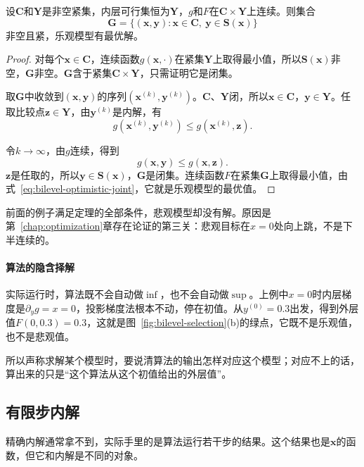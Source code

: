 \begin{theorem}[乐观模型解的存在]
\label{thm:bilevel-optimistic-existence}
设$\bm{C}$和$\bm{Y}$是非空紧集，内层可行集恒为$\bm{Y}$，$g$和$F$在$\bm{C}\times\bm{Y}$上连续。则集合
\begin{equation}
 \bm{G}=\{(\bm{x},\bm{y}):\bm{x}\in\bm{C},\ \bm{y}\in\bm{S}(\bm{x})\}
 \label{eq:bilevel-graph}
\end{equation}
非空且紧，乐观模型有最优解。
\end{theorem}

\begin{proof}
对每个$\bm{x}\in\bm{C}$，连续函数$g(\bm{x},\cdot)$在紧集$\bm{Y}$上取得最小值，所以$\bm{S}(\bm{x})$非空，$\bm{G}$非空。$\bm{G}$含于紧集$\bm{C}\times\bm{Y}$，只需证明它是闭集。

取$\bm{G}$中收敛到$(\bm{x},\bm{y})$的序列$(\bm{x}^{(k)},\bm{y}^{(k)})$。$\bm{C}$、$\bm{Y}$闭，所以$\bm{x}\in\bm{C}$，$\bm{y}\in\bm{Y}$。任取比较点$\bm{z}\in\bm{Y}$，由$\bm{y}^{(k)}$是内解，有
\[
 g(\bm{x}^{(k)},\bm{y}^{(k)})\leq g(\bm{x}^{(k)},\bm{z}).
\]

令$k\to\infty$，由$g$连续，得到
\[
 g(\bm{x},\bm{y})\leq g(\bm{x},\bm{z}).
\]
$\bm{z}$是任取的，所以$\bm{y}\in\bm{S}(\bm{x})$，$\bm{G}$是闭集。连续函数$F$在紧集$\bm{G}$上取得最小值，由式~\eqref{eq:bilevel-optimistic-joint}，它就是乐观模型的最优值。
\end{proof}

前面的例子满足定理的全部条件，悲观模型却没有解。原因是第~\ref{chap:optimization}章存在论证的第三关：悲观目标在$x=0$处向上跳，不是下半连续的。

\paragraph{算法的隐含择解}
实际运行时，算法既不会自动做$\inf$，也不会自动做$\sup$。上例中$x=0$时内层梯度是$\partial_yg=x=0$，投影梯度法根本不动，停在初值。从$y^{(0)}=0.3$出发，得到外层值$F(0,0.3)=0.3$，这就是图~\ref{fig:bilevel-selection}(b)的绿点，它既不是乐观值，也不是悲观值。

所以声称求解某个模型时，要说清算法的输出怎样对应这个模型；对应不上的话，算出来的只是“这个算法从这个初值给出的外层值”。

\subsection{有限步内解}
\label{sec:bilevel-finite}

精确内解通常拿不到，实际手里的是算法运行若干步的结果。这个结果也是$\bm{x}$的函数，但它和内解是不同的对象。

